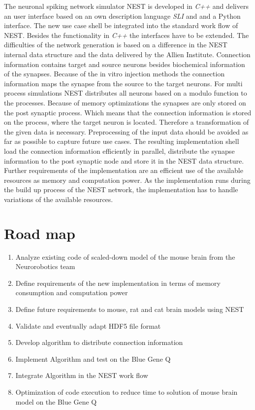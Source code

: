 \documentclass[a4paper]{article}
\begin{document}
The neuronal spiking network simulator NEST is developed in \emph{C++} and delivers
an user interface based on an own description language \emph{SLI} and  and a Python interface.
The new use case shell be integrated into the standard work flow of NEST.
Besides the functionality in \emph{C++} the interfaces have to be extended.
The difficulties of the network generation is based on a difference in 
the NEST internal data structure and the data delivered by the Allien Institute.
Connection information contains target and source neurons besides biochemical
information of the synapses. Because of the in vitro injection methods the
connection information maps the synapse from the source to the target neurons.
For multi process simulations NEST distributes all neurons based on a modulo function 
to the processes. Because of memory optimizations the synapses are only stored on the
post synaptic process. Which means that the connection information is stored
on the process, where the target neuron is located. Therefore a transformation of the given data is
necessary. Preprocessing of the input data should be avoided as far as possible to capture
future use cases.
The resulting implementation shell load the connection information efficiently in parallel,
distribute the synapse information to the post synaptic node and store it in
the NEST data structure.
Further requirements of the implementation are an efficient use of the available resources as
memory and computation power. As the implementation runs during the build up process of the
NEST network, the implementation has to handle variations of the available resources. 

\newpage
\section{Road map}
\begin{enumerate}
    \item Analyze existing code of scaled-down model of the mouse brain from the Neurorobotics team
    \item Define requirements of the new implementation in terms of memory consumption and computation power
    \item Define future requirements to mouse, rat and cat brain models using NEST
    \item Validate and eventually adapt HDF5 file format
    \item Develop algorithm to distribute connection information
    \item Implement Algorithm and test on the Blue Gene Q
    \item Integrate Algorithm in the NEST work flow
    \item Optimization of code execution to reduce time to solution of mouse brain model on the Blue Gene Q
\end{enumerate}
\end{document}
